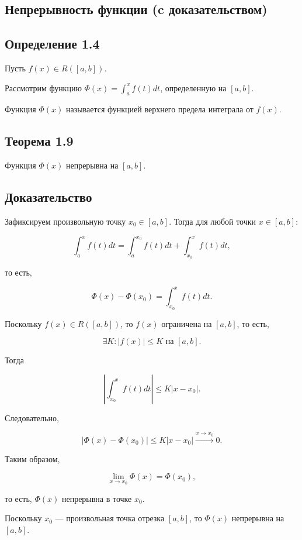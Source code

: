 {
\subsection{Непрерывность  функции (c доказательством)}
\subsection*{Определение 1.4}

Пусть \( f(x) \in R([a, b]) \).

Рассмотрим функцию \( \Phi(x) = \int_{a}^{x} f(t) dt \), определенную на \( [a, b] \).

Функция \( \Phi(x) \) называется функцией верхнего предела интеграла от \( f(x) \).


\subsection*{Теорема 1.9}

Функция \( \Phi(x) \) непрерывна на \( [a, b] \).

\subsection*{Доказательство}

Зафиксируем произвольную точку \( x_0 \in [a, b] \). Тогда для любой точки \( x \in [a, b] \):

\[
\int_{a}^{x} f(t)dt = \int_{a}^{x_0} f(t)dt + \int_{x_0}^{x} f(t)dt,
\]

то есть,

\[
\Phi(x) - \Phi(x_0) = \int_{x_0}^{x} f(t)dt.
\]

Поскольку \( f(x) \in R([a, b]) \), то \( f(x) \) ограничена на \( [a, b] \), то есть,

\[
\exists K: |f(x)| \leq K \text{ на } [a, b].
\]

Тогда

\[
\left| \int_{x_0}^{x} f(t)dt \right| \leq K|x - x_0|.
\]



Следовательно,

\[
\left| \Phi(x) - \Phi(x_0) \right| \leq K|x - x_0| \xrightarrow{x \to x_0} 0.
\]

Таким образом,

\[
\lim_{x \to x_0} \Phi(x) = \Phi(x_0),
\]


то есть, \( \Phi(x) \) непрерывна в точке \( x_0 \).

Поскольку \( x_0 \) — произвольная точка отрезка \( [a, b] \), то \( \Phi(x) \) непрерывна на \( [a, b] \).

}
